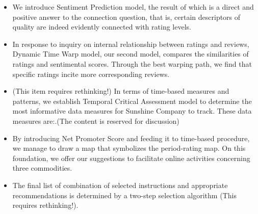 \documentclass[12pt]{article}%
\begin{document}
\begin{itemize}
	\item We introduce Sentiment Prediction model, the result of which is a direct and positive answer to the connection question, that is, certain descriptors of quality are indeed evidently connected with rating levels. 
	\item In response to inquiry on internal relationship between ratings and reviews, Dynamic Time Warp model, our second model, compares the similarities of ratings and sentimental scores. Through the best warping path, we find that specific ratings incite more corresponding reviews. 
	\item (This item requires rethinking!) In terms of time-based measures and patterns, we establish Temporal Critical Assessment model to determine the most informative data measures for Sunshine Company to track. These data measures are:.(The content is reserved for discussion)
	\item  By introducing Net Promoter Score and feeding it to time-based procedure, we manage to draw a map that symbolizes the period-rating map. On this foundation, we offer our suggestions to facilitate online activities concerning three commodities.
	\item  The final list of combination of selected instructions and appropriate recommendations is determined by a two-step selection algorithm (This requires rethinking!). 
\end{itemize}
\end{document}
